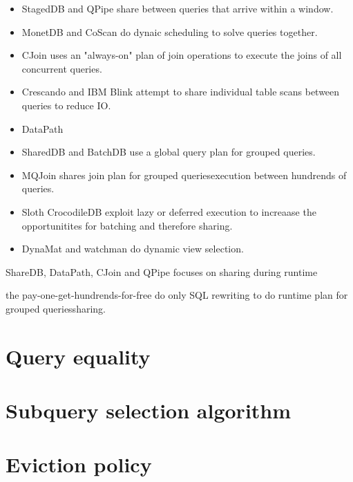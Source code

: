 \begin{itemize}
\item StagedDB \cite{harizopoulosStagedDBDesigningDatabase2005} and QPipe
\cite{harizopoulosQpipeSimultaneouslyPipelined2005} share between
queries that arrive within a window.
\item MonetDB \cite{idreosMonetdbTwoDecades2012} and CoScan
\cite{wangCoscanCooperativeScan2011} do dynaic scheduling to solve
queries together.
\item CJoin \cite{candeaScalablePredictableJoin2009} uses an "always-on"
plan of join operations to execute the joins of all concurrent
queries.
\item Crescando \cite{ssgiannikisCrescando2010} and IBM Blink
\cite{ramanConstanttimeQueryProcessing2008} attempt to share
individual table scans between queries to reduce IO.
\item DataPath \cite{arumugamDataPathSystemDatacentric2010}
\item SharedDB \cite{giannikisSharedDBKillingOne2012} and BatchDB
\cite{makreshanskiBatchDBEfficientIsolated2017} use a global query
plan for grouped queries.
\item MQJoin \cite{makreshanskiMqjoinEfficientShared2016a} shares join
plan for grouped queriesexecution between hundrends of queries.
\item Sloth \cite{cheungSlothBeingLazy2016} CrocodileDB
\cite{shangCrocodileDBEfficientDatabase2020} exploit lazy or deferred
execution to increaase the opportunitites for batching and therefore
sharing.
\item DynaMat \cite{kotidisDynamatDynamicView1999} and watchman
\cite{scheuermannWatchmanDataWarehouse1996} do dynamic view
selection.
\end{itemize}

ShareDB, DataPath, CJoin and QPipe focuses on sharing during runtime

the pay-one-get-hundrends-for-free do only SQL rewriting to do runtime
  plan for grouped queriessharing.


\cite{mounaProResProactiveReselection2022}


\section{Query equality}
\label{sec:orga919a5f}

\section{Subquery selection algorithm}
\label{sec:org70319fb}

\section{Eviction policy}
\label{sec:orgd16def2}

